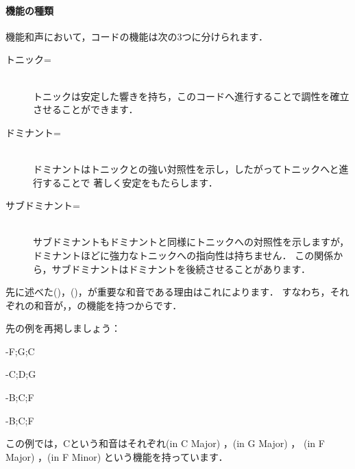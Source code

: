 \documentclass[dvipdfmx,uplatex,b5paper,openany,jbase=12Q,nomag*,textwidth-limit=44%
               ]{gachimuchi}[2020/05/05]
\begin{document}
\paragraph{機能の種類}
機能和声において，コードの機能は次の3つに分けられます．
\begin{description}
  \item[トニック=]~\\
  トニックは安定した響きを持ち，このコードへ進行することで調性を確立させることができます．
  \item[ドミナント=]~\\
  ドミナントはトニックとの強い対照性を示し，したがってトニックへと進行することで
  著しく安定をもたらします．
  \item[サブドミナント=]~\\
  サブドミナントもドミナントと同様にトニックへの対照性を示しますが，
  ドミナントほどに強力なトニックへの指向性は持ちません．
  この関係から，サブドミナントはドミナントを後続させることがあります．
\end{description}

先に述べた\Gni(\Min)，\Gniv(\Min)，\Gnv が重要な和音である理由はこれによります．
すなわち，それぞれの和音が，，の機能を持つからです．

先の例を再掲しましょう：
\begin{enumerate}
  \begin{minipage}{.45\linewidth}%
  \item \CProgl-{F;G;C}%
  \item \CProgl-{C;D;G}%
  \end{minipage}
  \begin{minipage}{.45\linewidth}%
  \item \CProgl-{B\aFlat;C;F}%
  \item \CProgl-{B\aFlat\Min;C;F\Min}%
  \end{minipage}
\end{enumerate}
この例では，Cという和音はそれぞれ(in C Major) ，(in G Major) ，
(in F Major) ，(in F Minor) という機能を持っています．
\end{document}
